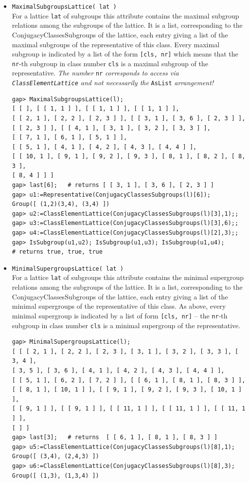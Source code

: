 \documentclass[11pt]{amsart}
\theoremstyle{plain}
\newcommand{\codesize}{\footnotesize}
\newcommand{\<}{\ensuremath{\langle}}
\renewcommand{\>}{\ensuremath{\rangle}}
\begin{document}
\begin{itemize}
\item {\tt MaximalSubgroupsLattice( lat )}\\
For a lattice {\tt lat} of subgroups this attribute contains the maximal subgroup relations among the subgroups
of the lattice. It is a list, corresponding to the ConjugacyClassesSubgroups of the lattice, each entry giving
a list of the maximal subgroups of the representative of this class. Every maximal subgroup is indicated by
a list of the form {\tt [cls, nr]} which means that the {\tt nr}-th subgroup in class
number {\tt cls} is a maximal subgroup of the representative.
{\it The number} {\tt nr} {\it corresponds to access via {\tt ClassElementLattice} and not
necessarily the} {\tt AsList} {\it arrangement!}
{\codesize
\begin{verbatim}
gap> MaximalSubgroupsLattice(l);
[ [ ], [ [ 1, 1 ] ], [ [ 1, 1 ] ], [ [ 1, 1 ] ],
[ [ 2, 1 ], [ 2, 2 ], [ 2, 3 ] ], [ [ 3, 1 ], [ 3, 6 ], [ 2, 3 ] ],
[ [ 2, 3 ] ], [ [ 4, 1 ], [ 3, 1 ], [ 3, 2 ], [ 3, 3 ] ],
[ [ 7, 1 ], [ 6, 1 ], [ 5, 1 ] ],
[ [ 5, 1 ], [ 4, 1 ], [ 4, 2 ], [ 4, 3 ], [ 4, 4 ] ],
[ [ 10, 1 ], [ 9, 1 ], [ 9, 2 ], [ 9, 3 ], [ 8, 1 ], [ 8, 2 ], [ 8, 3 ],
[ 8, 4 ] ] ]
gap> last[6];   # returns [ [ 3, 1 ], [ 3, 6 ], [ 2, 3 ] ]
gap> u1:=Representative(ConjugacyClassesSubgroups(l)[6]);
Group([ (1,2)(3,4), (3,4) ])
gap> u2:=ClassElementLattice(ConjugacyClassesSubgroups(l)[3],1);;
gap> u3:=ClassElementLattice(ConjugacyClassesSubgroups(l)[3],6);;
gap> u4:=ClassElementLattice(ConjugacyClassesSubgroups(l)[2],3);;
gap> IsSubgroup(u1,u2); IsSubgroup(u1,u3); IsSubgroup(u1,u4);
# returns true, true, true
\end{verbatim}}
\item {\tt MinimalSupergroupsLattice( lat )}\\
For a lattice {\tt lat} of subgroups this attribute contains the minimal supergroup relations among the subgroups
of the lattice. It is a list, corresponding to the ConjugacyClassesSubgroups of the lattice, each entry giving
a list of the minimal supergroups of the representative of this class. As above, every minimal supergroup is indicated
by a list of form {\tt [cls, nr]} -- 
the {\tt nr}-th subgroup in class number {\tt cls} is a minimal supergroup of the representative.
{\codesize
\begin{verbatim}
gap> MinimalSupergroupsLattice(l);
[ [ [ 2, 1 ], [ 2, 2 ], [ 2, 3 ], [ 3, 1 ], [ 3, 2 ], [ 3, 3 ], [ 3, 4 ],
[ 3, 5 ], [ 3, 6 ], [ 4, 1 ], [ 4, 2 ], [ 4, 3 ], [ 4, 4 ] ],
[ [ 5, 1 ], [ 6, 2 ], [ 7, 2 ] ], [ [ 6, 1 ], [ 8, 1 ], [ 8, 3 ] ],
[ [ 8, 1 ], [ 10, 1 ] ], [ [ 9, 1 ], [ 9, 2 ], [ 9, 3 ], [ 10, 1 ] ],
[ [ 9, 1 ] ], [ [ 9, 1 ] ], [ [ 11, 1 ] ], [ [ 11, 1 ] ], [ [ 11, 1 ] ],
[ ] ]
gap> last[3];   # returns  [ [ 6, 1 ], [ 8, 1 ], [ 8, 3 ] ]
gap> u5:=ClassElementLattice(ConjugacyClassesSubgroups(l)[8],1);
Group([ (3,4), (2,4,3) ])
gap> u6:=ClassElementLattice(ConjugacyClassesSubgroups(l)[8],3);
Group([ (1,3), (1,3,4) ])
\end{verbatim}}
\end{itemize}
\end{document}
